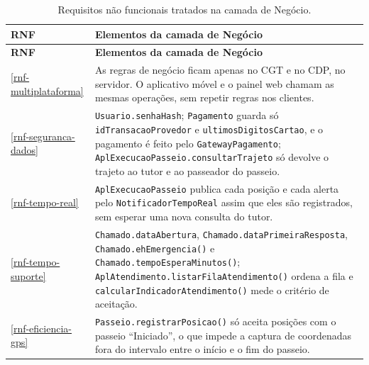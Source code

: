 \begin{footnotesize}
\begin{longtable}{|p{1.6cm}|p{11.8cm}|}
	\caption{Requisitos não funcionais tratados na camada de Negócio.}
	\label{tabela-rnfs-negocio}\\\hline

	\rowcolor{lightgray}
	\textbf{RNF} & \textbf{Elementos da camada de Negócio} \\\hline
	\endfirsthead
	\hline
	\rowcolor{lightgray}
	\textbf{RNF} & \textbf{Elementos da camada de Negócio} \\\hline
	\endhead

	\ref{rnf-multiplataforma} & As regras de negócio ficam apenas no CGT e no CDP, no servidor. O aplicativo móvel e o painel web chamam as mesmas operações, sem repetir regras nos clientes. \\\hline

	\ref{rnf-seguranca-dados} & \texttt{Usuario.senhaHash}; \texttt{Pagamento} guarda só \texttt{idTransacaoProvedor} e \texttt{ultimosDigitosCartao}, e o pagamento é feito pelo \texttt{GatewayPagamento}; \texttt{AplExecucaoPasseio.consultarTrajeto} só devolve o trajeto ao tutor e ao passeador do passeio. \\\hline

	\ref{rnf-tempo-real} & \texttt{AplExecucaoPasseio} publica cada posição e cada alerta pelo \texttt{NotificadorTempoReal} assim que eles são registrados, sem esperar uma nova consulta do tutor. \\\hline

	\ref{rnf-tempo-suporte} & \texttt{Chamado.dataAbertura}, \texttt{Chamado.dataPrimeiraResposta}, \texttt{Chamado.ehEmergencia()} e \texttt{Chamado.tempoEsperaMinutos()}; \texttt{AplAtendimento.listarFilaAtendimento()} ordena a fila e \texttt{calcularIndicadorAtendimento()} mede o critério de aceitação. \\\hline

	\ref{rnf-eficiencia-gps} & \texttt{Passeio.registrarPosicao()} só aceita posições com o passeio ``Iniciado'', o que impede a captura de coordenadas fora do intervalo entre o início e o fim do passeio. \\\hline
\end{longtable}
\end{footnotesize}